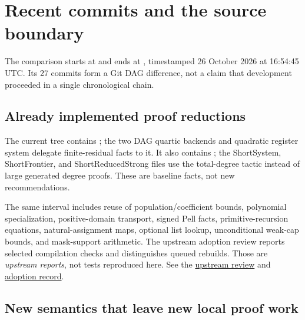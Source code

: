 \section{Recent commits and the source boundary}

The comparison starts at  and ends at , timestamped 26 October 2026 at 16:54:45 UTC. Its 27 commits form a Git DAG difference, not a claim that development proceeded in a single chronological chain.

\subsection{Already implemented proof reductions}

The current tree contains ; the two DAG quartic backends and quadratic register system delegate finite-residual facts to it. It also contains ; the ShortSystem, ShortFrontier, and ShortReducedStrong files use the total-degree tactic instead of large generated degree proofs. These are baseline facts, not new recommendations.

The same interval includes reuse of population/coefficient bounds, polynomial specialization, positive-domain transport, signed Pell facts, primitive-recursion equations, natural-assignment maps, optional list lookup, unconditional weak-cap bounds, and mask-support arithmetic. The upstream adoption review reports selected compilation checks and distinguishes queued rebuilds. Those are \emph{upstream reports}, not tests reproduced here. See the \href{https://github.com/VladimirReshetnikov/ProveIt/blob/22e020937caa81d0cb72a4f63071d6c0bcc1eba9/Computability/DiophantineConsistency/reviews/lean-proof-simplification-20261026-root.md}{upstream review} and \href{https://github.com/VladimirReshetnikov/ProveIt/blob/22e020937caa81d0cb72a4f63071d6c0bcc1eba9/Computability/DiophantineConsistency/research/lean-proof-simplification/ADOPTION.md}{adoption record}.

\subsection{New semantics that leave new local proof work}

